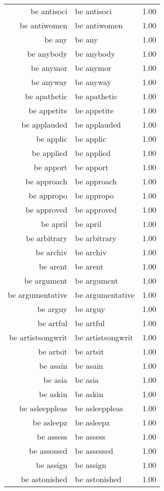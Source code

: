 \begin{table}[ht]
\begin{tabular}{rlr}
  be antisoci & be antisoci & 1.00 \\ 
  be antiwomen & be antiwomen & 1.00 \\ 
  be any & be any & 1.00 \\ 
  be anybody & be anybody & 1.00 \\ 
  be anymor & be anymor & 1.00 \\ 
  be anyway & be anyway & 1.00 \\ 
  be apathetic & be apathetic & 1.00 \\ 
  be appetite & be appetite & 1.00 \\ 
  be applauded & be applauded & 1.00 \\ 
  be applic & be applic & 1.00 \\ 
  be applied & be applied & 1.00 \\ 
  be apport & be apport & 1.00 \\ 
  be approach & be approach & 1.00 \\ 
  be appropo & be appropo & 1.00 \\ 
  be approved & be approved & 1.00 \\ 
  be april & be april & 1.00 \\ 
  be arbitrary & be arbitrary & 1.00 \\ 
  be archiv & be archiv & 1.00 \\ 
  be arent & be arent & 1.00 \\ 
  be argument & be argument & 1.00 \\ 
  be argumentative & be argumentative & 1.00 \\ 
  be arguy & be arguy & 1.00 \\ 
  be artful & be artful & 1.00 \\ 
  be artistsongwrit & be artistsongwrit & 1.00 \\ 
  be artsit & be artsit & 1.00 \\ 
  be asain & be asain & 1.00 \\ 
  be asia & be asia & 1.00 \\ 
  be askin & be askin & 1.00 \\ 
  be asleeppleas & be asleeppleas & 1.00 \\ 
  be asleepz & be asleepz & 1.00 \\ 
  be assess & be assess & 1.00 \\ 
  be assessed & be assessed & 1.00 \\ 
  be assign & be assign & 1.00 \\ 
  be astonished & be astonished & 1.00 \\ 

\end{tabular}
\end{table}
